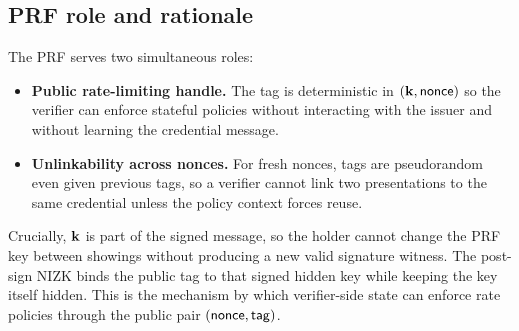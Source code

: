 \subsection{PRF role and rationale}
The PRF serves two simultaneous roles:
\begin{itemize}[leftmargin=1.25em]
  \item \textbf{Public rate-limiting handle.} The tag is deterministic in \((\mathbf{k},\mathsf{nonce})\) so the verifier can
  enforce stateful policies without interacting with the issuer and without learning the credential message.
  \item \textbf{Unlinkability across nonces.} For fresh nonces, tags are pseudorandom even given previous tags, so a
  verifier cannot link two presentations to the same credential unless the policy context forces reuse.
\end{itemize}
Crucially, \(\mathbf{k}\) is part of the signed message, so the holder cannot change the PRF key between showings without
producing a new valid signature witness. The post-sign NIZK binds the public tag to that signed hidden key while keeping
the key itself hidden. This is the mechanism by which verifier-side state can enforce rate policies through the public
pair \((\mathsf{nonce},\mathsf{tag})\).

